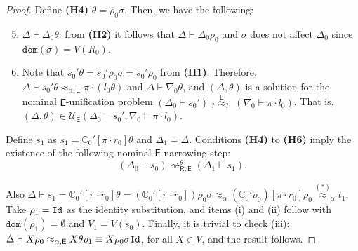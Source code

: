 \documentclass[submission,copyright,creativecommons]{eptcs}
\newcommand{\aleq}{\approx_{\alpha}}
\newcommand{\ealeq}{\approx_{\alpha,\theory{E}}}
\newcommand{\dom}[1]{\mathtt{dom}(#1)}
\newcommand{\theory}[1]{\ensuremath{\mathsf{#1}}}
\newcommand{\context}[1]{\mathbb{C}}
\theoremstyle{plain}
\theoremstyle{definition}
\theoremstyle{remark}
\begin{document}
\begin{proof}
Define {\bf (H4)} $\theta=\rho_0\sigma$. 
Then, we have the following:
\begin{enumerate}[{\bf (H1)}]
\setcounter{enumi}{4}
    \item $\Delta \vdash \Delta_0\theta$: from {\bf (H2)} it follows that $\Delta \vdash \Delta_0\rho_0$ and $\sigma$ does not affect $\Delta_0$ since $\texttt{dom}(\sigma) = V(R_0)$.
    \item Note that $s_0'\theta=s_0'\rho_0\sigma=s_0'\rho_0$ from {\bf (H1)}. Therefore, $\Delta \vdash s_0'\theta \ealeq \pi\cdot (l_0\theta)$ and $\Delta \vdash\nabla_0\theta$,
    and  $(\Delta,\theta)$
    is a solution for the nominal \theory{E}-unification problem $(\Delta_0 \vdash s_0') \; _?\overset{\theory{E}}{{\approx}}_? \; (\nabla_0 \vdash \pi\cdot l_0)$. That is, $(\Delta, \theta)\in \mathcal{U}_\theory{E}(\Delta_0 \vdash s_0', \nabla_0 \vdash \pi\cdot l_0)$.
\end{enumerate}

Define $s_1$ as $s_1=\context{C}_0'[\pi\cdot r_0]\theta$ and $\Delta_1=\Delta$. Conditions {\bf (H4)} to {\bf (H6)} imply the existence of the  following nominal  \theory{E}-narrowing step:
 $$(\Delta_0 \vdash s_0) \rightsquigarrow^\theta_{\theory{R,E}} (\Delta_1 \vdash s_1).$$

Also $\Delta\vdash s_1=\context{C}_0'[\pi\cdot r_0]\theta=(\context{C}_0'[\pi\cdot r_0])\rho_0\sigma \aleq (\context{C}_0'\rho_0)[\pi\cdot r_0]\rho_0 \overset{(*)}{\approx}_{\alpha}  t_1$. Take $\rho_1={\tt Id}$ as the identity substitution, and items (i) and (ii) follow with $\dom{\rho_1}=\emptyset$ and $V_1=V(s_0)$.
Finally, it is trivial to check (iii):   $\Delta\vdash X\rho_0\ealeq  X\theta\rho_1\equiv X\rho_0\sigma{\tt Id}$, for all $X\in V$, and the result follows.





\end{proof}
\end{document}
